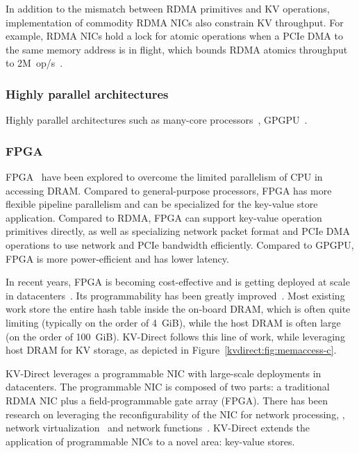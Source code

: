 {In addition to the mismatch between RDMA primitives and KV operations, implementation of commodity RDMA NICs also constrain KV throughput. For example, RDMA NICs hold a lock for atomic operations when a PCIe DMA to the same memory address is in flight, which bounds RDMA atomics throughput to \approx2M~op/s~\cite{kalia2016design}.

\subsubsection{Highly parallel architectures}

Highly parallel architectures such as many-core processors~\cite{berezecki2011many}, GPGPU~\cite{zhang2015mega}.

\subsubsection{FPGA}

FPGA~\cite{istvan2013flexible, chalamalasetti2013fpga, maohardware, lavasani2014fpga, istvan2015hash, istvan2016consensus, kvs-openpower, istvan2015hash, sidler2015scalable, blott2015scaling} have been explored to overcome the limited parallelism of CPU in accessing DRAM.
Compared to general-purpose processors, FPGA has more flexible pipeline parallelism and can be specialized for the key-value store application.
Compared to RDMA, FPGA can support key-value operation primitives directly, as well as specializing network packet format and PCIe DMA operations to use network and PCIe bandwidth efficiently.
Compared to GPGPU, FPGA is more power-efficient and has lower latency.

In recent years, FPGA is becoming cost-effective and is getting deployed at scale in datacenters~\cite{putnam2014programmable, caulfield2016cloud}. Its programmability has been greatly improved~\cite{li2016clicknp}.
Most existing work store the entire hash table inside the on-board DRAM, which is often quite limiting (typically on the order of 4~GiB), while the host DRAM is often large (on the order of 100~GiB).
KV-Direct follows this line of work, while leveraging host DRAM for KV storage, as depicted in Figure~\ref{kvdirect:fig:memaccess-c}.

KV-Direct leverages a programmable NIC with large-scale deployments in datacenters.
The programmable NIC is composed of two parts: a traditional RDMA NIC plus a field-programmable gate array (FPGA).
There has been research on leveraging the reconfigurability of the NIC for network processing, \eg, network virtualization~\cite{greenberg2015sdn, vfp} and network functions~\cite{li2016clicknp}.
KV-Direct extends the application of programmable NICs to a novel area: key-value stores.
}

